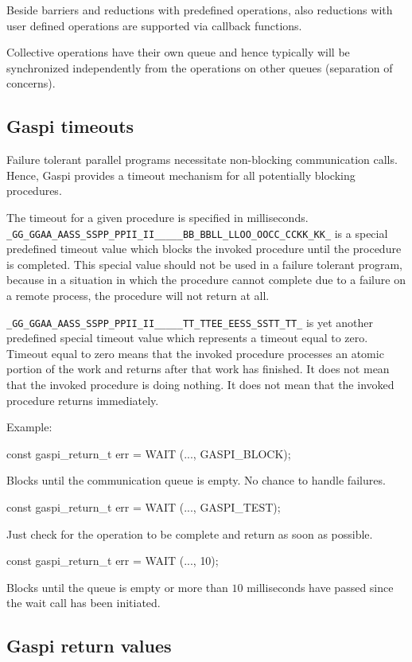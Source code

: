 \documentclass{article}
\makeatletter
\newlength{\st}\setlength{\st}{0pt}
\newcommand{\zerowsep}{\hskip 0pt plus 0.1pt minus 0.1pt}
\newcommand{\ZSEP}[1]{\ifx#1\@@@EOZ@@@\let\next\relax\else\ifx#1\_#1\zerowsep\else#1\fi\let\next\ZSEP\fi\next}
\newcommand{\zsep}[1]{\ZSEP{}#1\@@@EOZ@@@}
\newcommand{\GASPI}{{\sc Gaspi}}
\newcommand{\GASPITEST}{{\tt\protect\zsep{GASPI\_TEST}}}
\newcommand{\GASPIBLOCK}{{\tt\protect\zsep{GASPI\_BLOCK}}}
\makeatother
\begin{document}
Beside barriers and reductions with predefined operations, also
reductions with user defined operations are supported via callback
functions.

Collective operations have their own queue and hence typically will be synchronized 
independently from the operations on other queues (separation of concerns).

\subsection{\GASPI{} timeouts}
\label{SubSec::Timeout}

Failure tolerant parallel programs necessitate non-blocking
communication calls.  Hence, \GASPI{} provides a timeout mechanism for
all potentially blocking procedures.

The timeout for a given procedure is specified in milliseconds.
\GASPIBLOCK{} is a special predefined timeout value which blocks the
invoked procedure until the procedure is completed. This special value
should not be used in a failure tolerant program, because in a
situation in which the procedure cannot complete due to a failure on a
remote process, the procedure will not return at all.

\GASPITEST{} is yet another predefined special timeout value which
represents a timeout equal to zero. Timeout equal to zero means that
the invoked procedure processes an atomic portion of the work and
returns after that work has finished. It does not mean that the
invoked procedure is doing nothing. It does not mean that the invoked
procedure returns immediately.

Example:
\begin{listing}{1}
const gaspi_return_t err = WAIT (..., GASPI_BLOCK);
\end{listing}
Blocks until the communication queue is empty. No chance to handle
failures.
\begin{listing}{1}
const gaspi_return_t err = WAIT (..., GASPI_TEST);
\end{listing}
Just check for the operation to be complete and return as soon as possible.
\begin{listing}{1}
const gaspi_return_t err = WAIT (..., 10);
\end{listing}
Blocks until the queue is empty or more than $10$ milliseconds have
passed since the wait call has been initiated.

\subsection{\GASPI{} return values}
\end{document}
